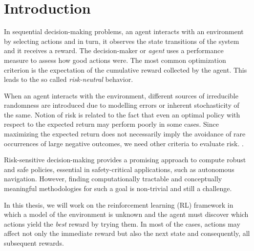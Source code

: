 \chapter{Introduction}
\label{sec:introduction}


In sequential decision-making problems, an agent interacts with an environment by 
selecting actions and in turn, it observes the state transitions of the system and it receives a reward.
The decision-maker or \textit{agent} uses a performance measure to assess how good actions were.
The most common optimization criterion is the expectation of the cumulative reward
collected by the agent. This leads to the so called \textit{risk-neutral} behavior.

When an agent interacts with the environment, different sources of irreducible 
randomness are introduced due to modelling errors or inherent stochasticity of the same.
Notion of risk is related to the fact that even an optimal policy with respect to the 
expected return may perform poorly in some cases.
Since maximizing the expected return does not necessarily imply the avoidance
of rare occurrences of large negative outcomes,
we need other criteria to evaluate risk. \citep{Garcia2015}.

Risk-sensitive decision-making provides a promising
approach to compute robust and safe policies, essential in safety-critical applications,
such as autonomous navigation.
However, finding computationally tractable and conceptually meaningful methodologies for
such a goal is non-trivial and still a challenge.

In this thesis, we will work on the reinforcement learning (RL)
framework in which a model of the environment is unknown and the agent
must discover which actions yield the \textit{best} reward by trying them. 
In most of the cases,
actions may affect not only the immediate reward but also the next state and consequently,
all subsequent rewards.

